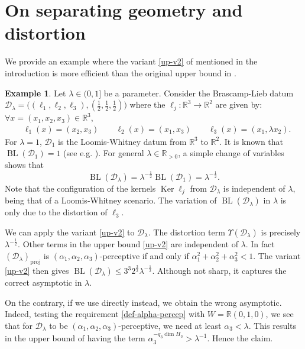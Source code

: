\documentclass[a4paper,english]{amsart}
\theoremstyle{definition}
\newtheorem*{example}{Example}
\newcommand{\R}{\mathbb{R}}
\newcommand{\1}{\mathbbm{1}}
\newcommand{\sD} {{\mathscr D}}
\DeclareMathOperator{\Ker}{Ker}
\DeclareMathOperator{\BL}{BL}
\begin{document}
\section{On separating geometry and distortion} \label{Sec-appendix}
We provide an example where the variant \eqref{up-v2} of   mentioned in the introduction is more efficient than the original upper bound in .
\begin{example}
Let $\lambda \in (0,1]$ be a parameter.
Consider the Brascamp-Lieb datum $\sD_\lambda = \bigl((\ell_1, \ell_2, \ell_3), (\frac{1}{2},\frac{1}{2}, \frac{1}{2})\bigr)$ where the $\ell_j \colon \R^3 \to \R^2$ are given by: $\forall x = (x_1, x_2, x_3) \in \R^3$,
\begin{align*}
&\ell_1 (x) = (x_2, x_3) \quad \quad \ell_2 (x) = (x_1, x_3) \quad \quad \ell_3 (x) = (x_1, \lambda x_2).
\end{align*}
For $\lambda = 1$, $\sD_1$ is the Loomis-Whitney datum from $\R^3$ to $\R^2$.
It is  known that $\BL(\sD_1) = 1$ (see e.g. \cite[Example 1.6]{BCCT08}).
For general $\lambda \in \R_{>0}$, a simple change of variables shows that
\[
\BL(\sD_\lambda) =  \lambda^{-\frac{1}{2}} \BL(\sD_1) = \lambda^{-\frac{1}{2}}.
\]
Note that the configuration of the kernels $\Ker \ell_{j}$ from $\sD_\lambda$ is independent of $\lambda$, being that of a Loomis-Whitney scenario.
The variation of $\BL(\sD_\lambda)$ in  $\lambda$ is only due to the distortion of $\ell_{3}$.

We can apply the variant   \eqref{up-v2}  to $\sD_\lambda$.
The distortion term $\Upsilon(\sD_\lambda)$ is precisely $\lambda^{-\frac{1}{2}}$.
Other terms in the upper bound \eqref{up-v2}  are independent of $\lambda$. In fact $(\sD_\lambda)_{\mathrm{proj}}$ is
$(\alpha_1, \alpha_2, \alpha_3)$-perceptive if and only if $\alpha_1^2 + \alpha_2^2 + \alpha_3^2 < 1$.
The  variant \eqref{up-v2} then gives $\BL(\sD_\lambda) \leq 3^3 2^{\frac{3}{2}}\lambda^{-\frac{1}{2}}$. Although not sharp, it captures the correct asymptotic in $\lambda$.

On the contrary, if we use  directly instead, we obtain the wrong asymptotic.
Indeed, testing the requirement \eqref{def-alpha-percep} with $W = \R(0,1,0)$, we see that for  $\sD_{\lambda}$ to be $(\alpha_1,\alpha_2,\alpha_3)$-perceptive,  we need at least $\alpha_3 < \lambda$.
This results in the upper bound of  having the term  $\alpha_3^{-q_3 \dim H_3} > \lambda^{-1}$. Hence the claim.




\end{example}
\end{document}
